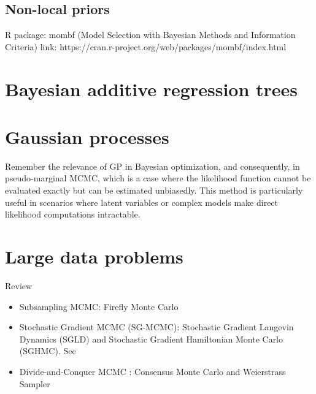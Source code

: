 \subsection{Non-local priors}\label{sec13_23}

\cite{johnson2012bayesian}
R package: mombf (Model Selection with Bayesian Methods and Information Criteria)
link: https://cran.r-project.org/web/packages/mombf/index.html

\section{Bayesian additive regression trees}\label{sec13_3}

\section{Gaussian processes}\label{13_4}

Remember the relevance of GP in Bayesian optimization, and consequently, in pseudo-marginal MCMC, which is a case where the likelihood function cannot be evaluated exactly but can be estimated unbiasedly. This method is particularly useful in scenarios where latent variables or complex models make direct likelihood computations intractable.

\section{Large data problems}
Review \cite{bardenet2017markov}
\begin{itemize}
	\item Subsampling MCMC: Firefly Monte Carlo \cite{Maclaurin2015}
	\item Stochastic Gradient MCMC (SG-MCMC): Stochastic Gradient Langevin Dynamics (SGLD) and Stochastic Gradient Hamiltonian Monte Carlo (SGHMC). See \cite{nemeth2021stochastic,song2020extended,baker2019sgmcmc,chen2014stochastic,welling2011bayesian}
	\item Divide-and-Conquer MCMC \cite{quiroz2018subsampling,quiroz2019speeding}: Consensus Monte Carlo \cite{rendell2020global,scott2022bayes} and Weierstrass Sampler \cite{wu2017average}
\end{itemize}

